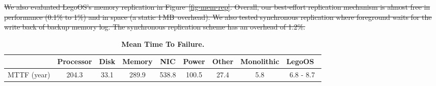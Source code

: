 \documentclass[10pt,times,twocolumn]{z2-article}
\renewcommand{\em}{\it}
\newcommand{\beforecaption}{\vspace{-.15cm}\begin{spacing}{0.85}}
\newcommand{\aftercaption}{\vspace{-.45cm}\end{spacing}}
\newcommand{\mycaption}[3]{\beforecaption\caption{\label{#1}{\bf\footnotesize #2} \em\scriptsize #3}\aftercaption}
\newcommand{\MB}{\,MB}
\newcommand{\lego}{LegoOS}
\providecommand{\DIFdeltex}[1]{{\protect\color{red}\sout{#1}}}                      %
\providecommand{\DIFdelend}{} %
\providecommand{\DIFdel}[1]{\texorpdfstring{\DIFdeltex{#1}}{}} %
\DeclareRobustCommand{\DIFdelend}{\DIFOaddend \let\includegraphics\DIFOincludegraphics} %
\begin{document}
{{{{{{{%
\DIFdel{We also evaluated \lego's memory replication in Figure~\ref{fig-mem-rep}.
Overall, our best-effort replication mechanism is almost free in performance (0.1\% to 1\%) and in space (a static 1\MB\ overhead).
We also tested synchronous replication where foreground waits for the write back of backup memory log.
The synchronous replication scheme has an overhead of 1.2\%.
}%

\DIFdelend {
\begin{table}[th]\footnotesize
\begin{center}
\begin{tabular}{ l || c | c | c | c | c | c || c | c}
 & Processor & Disk & Memory  & NIC & Power & Other & Monolithic & \lego\ \\
\hline

MTTF (year) & 204.3 & 33.1 & 289.9 & 538.8 & 100.5 & 27.4 & 5.8 & 6.8 - 8.7 \\

\end{tabular}
\end{center}
\vspace{-0.2in}
\mycaption{tbl-failure}{Mean Time To Failure.}
{
}
\end{table}
}


}}}}}}}
\end{document}
